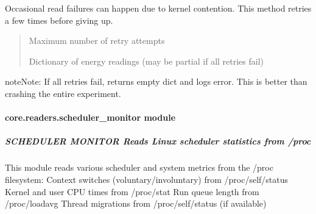 \documentclass[letterpaper,10pt,english]{sphinxmanual}
\begin{document}
\begin{fulllineitems}
\begin{fulllineitems}
\sphinxAtStartPar
Occasional read failures can happen due to kernel contention.
This method retries a few times before giving up.
\begin{quote}\begin{description}
\sphinxAtStartPar
{} \textendash{} Maximum number of retry attempts

\sphinxAtStartPar
Dictionary of energy readings (may be partial if all retries fail)

\end{description}\end{quote}

\begin{sphinxadmonition}{note}{Note:}
\sphinxAtStartPar
If all retries fail, returns empty dict and logs error.
This is better than crashing the entire experiment.
\end{sphinxadmonition}

\end{fulllineitems}


\end{fulllineitems}


\sphinxstepscope


\paragraph{core.readers.scheduler\_monitor module}
\label{\detokenize{core.readers.scheduler_monitor:module-core.readers.scheduler_monitor}}\label{\detokenize{core.readers.scheduler_monitor:core-readers-scheduler-monitor-module}}\label{\detokenize{core.readers.scheduler_monitor::doc}}

\subparagraph{SCHEDULER MONITOR \textendash{} Reads Linux scheduler statistics from /proc}
\label{\detokenize{core.readers.scheduler_monitor:scheduler-monitor-reads-linux-scheduler-statistics-from-proc}}
\sphinxAtStartPar
This module reads various scheduler and system metrics from the /proc filesystem:
\sphinxhyphen{} Context switches (voluntary/involuntary) from /proc/self/status
\sphinxhyphen{} Kernel and user CPU times from /proc/stat
\sphinxhyphen{} Run queue length from /proc/loadavg
\sphinxhyphen{} Thread migrations from /proc/self/status (if available)
\end{document}
